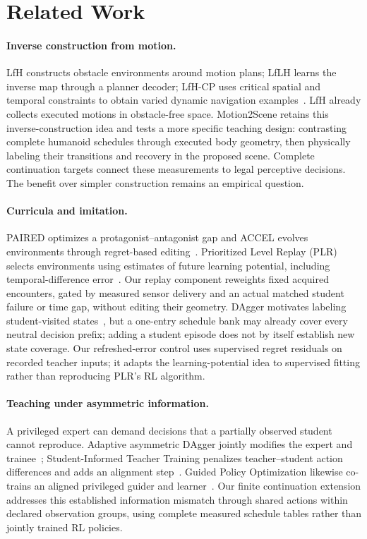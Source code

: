 \documentclass[10pt]{article}
\begin{document}
\section{Related Work}
\paragraph{Inverse construction from motion.}
LfH constructs obstacle environments around motion plans; LfLH learns the inverse
map through a planner decoder; LfH-CP uses critical spatial and temporal
constraints to obtain varied dynamic navigation examples~\cite{lfh,lflh,lfhcp}.
LfH already collects executed motions in obstacle-free space. Motion2Scene
retains this inverse-construction idea and tests a more specific teaching design:
contrasting complete humanoid schedules through executed body geometry, then
physically labeling their transitions and recovery in the proposed scene.
Complete continuation targets connect these measurements to legal perceptive
decisions. The benefit over simpler construction remains an empirical question.

\paragraph{Curricula and imitation.}
PAIRED optimizes a protagonist--antagonist gap and ACCEL evolves environments
through regret-based editing~\cite{paired,accel}. Prioritized Level Replay (PLR)
selects environments using estimates of future learning potential, including
temporal-difference error~\cite{plr}. Our replay component reweights
fixed acquired encounters, gated by measured sensor delivery and an
actual matched student failure or time gap, without editing their geometry.
DAgger motivates labeling
student-visited states~\cite{dagger}, but a one-entry schedule bank may already
cover every neutral decision prefix; adding a student episode does not by itself
establish new state coverage. Our refreshed-error control uses supervised regret
residuals on recorded teacher inputs; it adapts the learning-potential idea to
supervised fitting rather than reproducing PLR's RL algorithm.

\paragraph{Teaching under asymmetric information.}
A privileged expert can demand decisions that a partially observed student
cannot reproduce. Adaptive asymmetric DAgger jointly modifies the expert and
trainee~\cite{a2d}; Student-Informed Teacher Training penalizes teacher--student
action differences and adds an alignment step~\cite{sitt}. Guided Policy
Optimization likewise co-trains an aligned privileged guider and
learner~\cite{gpo}. Our finite continuation extension addresses this established
information mismatch through shared actions within declared observation groups,
using complete measured schedule tables rather than jointly trained RL policies.
\end{document}
